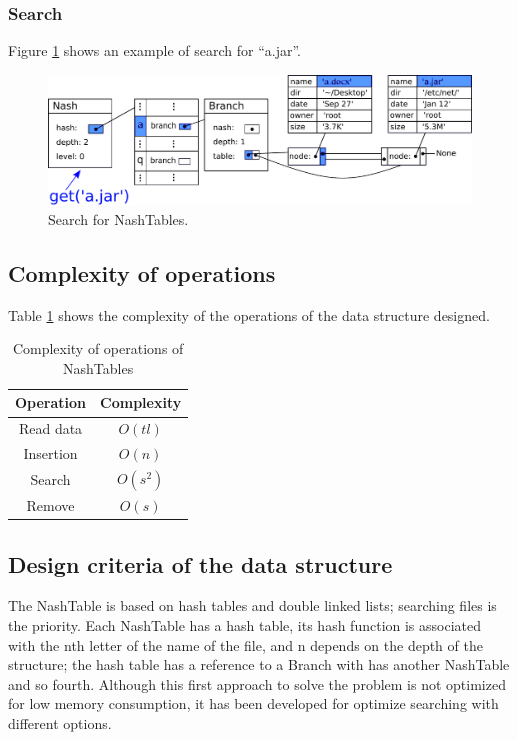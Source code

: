 \documentclass{sig-alternate-05-2015}
\begin{document}
  \subsubsection{Search}
  Figure \ref{img:nashGet} shows an example of search for ``a.jar''.
  \begin{figure}[t]
    \centering
    \includegraphics[scale=0.4]{NashGet.pdf}
    \caption{Search for NashTables.}
    \label{img:nashGet}
  \end{figure}

  \subsection{Complexity of operations}
  Table \ref{table:Complex} shows the complexity of the operations of the data structure designed.
  \begin{table}[b]
  \centering
  \caption{Complexity of operations of NashTables}
  \label{table:Complex}
  \begin{tabular}{cc}
  \hline
  \textbf{Operation} & \textbf{Complexity} \\ \hline
    Read data          & $O(tl)$             \\
    Insertion          & $O(n)$              \\
    Search             & $O(s^2)$            \\
    Remove             & $O(s)$              \\ \hline
  \end{tabular}
  \end{table}


  \subsection{Design criteria of the data structure}
    The NashTable is based on hash tables and double linked lists; searching files
    is the priority. Each NashTable has a hash table, its hash function is associated with the
    nth letter of the name of the file, and n depends on the depth of the structure;
    the hash table has a reference to a Branch with has another NashTable and so fourth.
    Although this first approach to solve the problem is not optimized for low memory consumption,
    it has been developed for optimize searching with different options.
\end{document}
